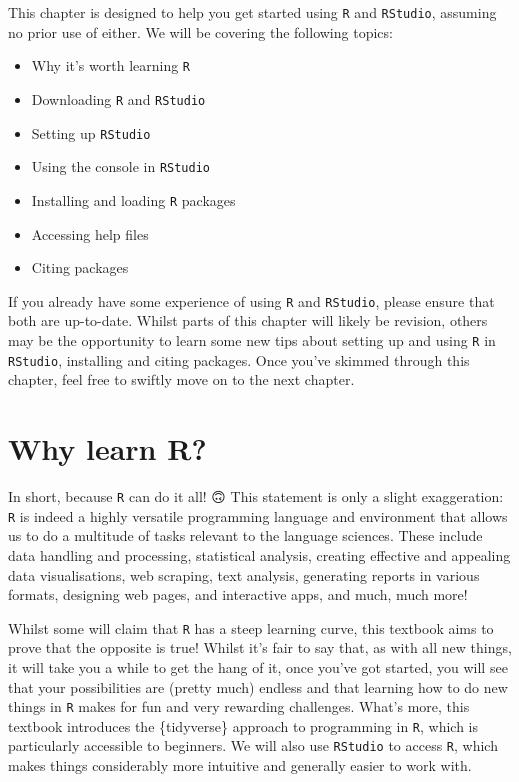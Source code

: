 \documentclass[
  letterpaper,
  DIV=11,
  numbers=noendperiod,
  oneside]{scrreprt}
\providecommand{\tightlist}{%
  \setlength{\itemsep}{0pt}\setlength{\parskip}{0pt}}\usepackage{longtable,booktabs,array}
\begin{document}
This chapter is designed to help you get started using \texttt{R} and
\texttt{RStudio}, assuming no prior use of either. We will be covering
the following topics:

\begin{itemize}
\tightlist
\item
  Why it's worth learning \texttt{R}
\item
  Downloading \texttt{R} and \texttt{RStudio}
\item
  Setting up \texttt{RStudio}
\item
  Using the console in \texttt{RStudio}
\item
  Installing and loading \texttt{R} packages
\item
  Accessing help files
\item
  Citing packages
\end{itemize}

If you already have some experience of using \texttt{R} and
\texttt{RStudio}, please ensure that both are up-to-date. Whilst parts
of this chapter will likely be revision, others may be the opportunity
to learn some new tips about setting up and using \texttt{R} in
\texttt{RStudio}, installing and citing packages. Once you've skimmed
through this chapter, feel free to swiftly move on to the next chapter.

\section{Why learn R?}\label{why-learn-r}

In short, because \texttt{R} can do it all! 🙃 This statement is only a
slight exaggeration: \texttt{R} is indeed a highly versatile programming
language and environment that allows us to do a multitude of tasks
relevant to the language sciences. These include data handling and
processing, statistical analysis, creating effective and appealing data
visualisations, web scraping, text analysis, generating reports in
various formats, designing web pages, and interactive apps, and much,
much more! 💪

Whilst some will claim that \texttt{R} has a steep learning curve, this
textbook aims to prove that the opposite is true! Whilst it's fair to
say that, as with all new things, it will take you a while to get the
hang of it, once you've got started, you will see that your
possibilities are (pretty much) endless and that learning how to do new
things in \texttt{R} makes for fun and very rewarding challenges. What's
more, this textbook introduces the \{tidyverse\} approach to programming
in \texttt{R}, which is particularly accessible to beginners. We will
also use \texttt{RStudio} to access \texttt{R}, which makes things
considerably more intuitive and generally easier to work with.
\end{document}
